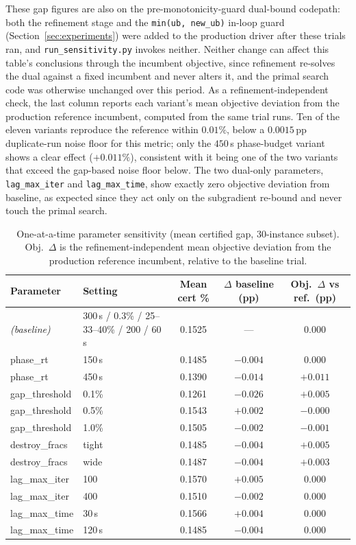 \documentclass[11pt]{article}
\begin{document}
These gap figures are also on the pre-monotonicity-guard dual-bound codepath:
both the refinement stage and the \texttt{min(ub, new\_ub)} in-loop guard
(Section~\ref{sec:experiments}) were added to the production driver after
these trials ran, and \texttt{run\_sensitivity.py} invokes neither. Neither
change can affect this table's conclusions through the incumbent objective,
since refinement re-solves the dual against a fixed incumbent and never
alters it, and the primal search code was otherwise unchanged over this
period. As a refinement-independent check, the last column reports each
variant's mean objective deviation from the production reference incumbent,
computed from the same trial runs. Ten of the eleven variants reproduce the
reference within $0.01\%$, below a $0.0015$\,pp duplicate-run noise floor for
this metric; only the $450$\,s phase-budget variant shows a clear effect
($+0.011\%$), consistent with it being one of the two variants that exceed the
gap-based noise floor below. The two dual-only parameters, \texttt{lag\_max\_iter}
and \texttt{lag\_max\_time}, show exactly zero objective deviation from
baseline, as expected since they act only on the subgradient re-bound and
never touch the primal search.

\begin{table}[h]
\centering
\caption{One-at-a-time parameter sensitivity (mean certified gap, 30-instance subset). Obj.\ $\Delta$ is the refinement-independent mean objective deviation from the production reference incumbent, relative to the baseline trial.}
\label{tab:sensitivity}
\begin{tabular}{llccc}
\toprule
Parameter & Setting & Mean cert \% & $\Delta$ baseline (pp) & Obj.\ $\Delta$ vs ref.\ (pp) \\
\midrule
\textit{(baseline)} & 300\,s / 0.3\% / 25--33--40\% / 200 / 60\,s & 0.1525 & --- & 0.000 \\
phase\_rt        & 150\,s  & 0.1485 & $-0.004$ & $0.000$ \\
phase\_rt        & 450\,s  & 0.1390 & $-0.014$ & $+0.011$ \\
gap\_threshold   & 0.1\%   & 0.1261 & $-0.026$ & $+0.005$ \\
gap\_threshold   & 0.5\%   & 0.1543 & $+0.002$ & $-0.000$ \\
gap\_threshold   & 1.0\%   & 0.1505 & $-0.002$ & $-0.001$ \\
destroy\_fracs   & tight   & 0.1485 & $-0.004$ & $+0.005$ \\
destroy\_fracs   & wide    & 0.1487 & $-0.004$ & $+0.003$ \\
lag\_max\_iter   & 100     & 0.1570 & $+0.005$ & $0.000$ \\
lag\_max\_iter   & 400     & 0.1510 & $-0.002$ & $0.000$ \\
lag\_max\_time   & 30\,s   & 0.1566 & $+0.004$ & $0.000$ \\
lag\_max\_time   & 120\,s  & 0.1485 & $-0.004$ & $0.000$ \\
\bottomrule
\end{tabular}
\end{table}
\end{document}
